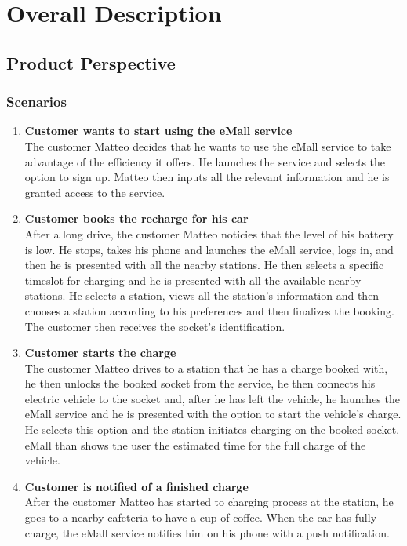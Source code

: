 \section{Overall Description}
\subsection{Product Perspective}
\subsubsection{Scenarios}
\begin{enumerate}
    \item \textbf{Customer wants to start using the eMall service}\\
    The customer Matteo decides that he wants to use the eMall service to 
    take advantage of the efficiency it offers. 
    He launches the service and selects the option to sign up. 
    Matteo then inputs all the relevant information and he is granted access to the service.
    \item \textbf{Customer books the recharge for his car}\\
    After a long drive, the customer Matteo noticies that the level of his battery is low. 
    He stops, takes his phone and launches the eMall service, logs in, and then he is presented with all the nearby stations.
    He then selects a specific timeslot for charging and he is presented with all the available nearby stations.
    He selects a station, views all the station's information and then chooses a station according to his preferences and then finalizes the booking.
    The customer then receives the socket's identification.
    \item \textbf{Customer starts the charge}\\
    The customer Matteo drives to a station that he has a charge booked with, he then unlocks the booked socket from the service, he then connects his electric 
    vehicle to the socket and, after he has left the vehicle, he launches the eMall service and 
    he is presented with the option to start the vehicle's charge. He selects this option and the station initiates charging on the booked socket. eMall than shows the user the estimated time for the full charge of the vehicle. 
    \item \textbf{Customer is notified of a finished charge}\\
    After the customer Matteo has started to charging process at the station,
     he goes to a nearby cafeteria to have a cup of coffee. When the car has fully charge, the eMall service notifies him on his phone with a push notification.

\end{enumerate}
